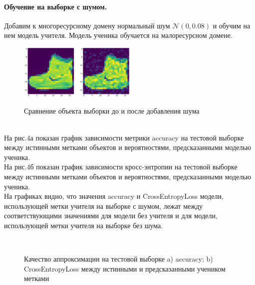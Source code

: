 \paragraph{Обучение на выборке с шумом.}
Добавим к многоресурсному домену нормальный шум $\mathcal{N}(0,0.08)$ и обучим на нем модель учителя. Модель ученика обучается на малоресурсном домене.
\begin{figure}[h!t]\center
{\includegraphics[width=0.5\textwidth]{results/noise}}
\caption{Сравнение объекта выборки до и после добавления шума}
\end{figure}\\
На рис.4а показан график зависимости метрики accuracy на тестовой выборке между истинными метками объектов и вероятностями, предсказанными моделью ученика.\\
На рис.4б показан график зависимости кросс-энтропии на тестовой выборке между истинными метками объектов и вероятностями, предсказанными моделью ученика.\\
На графиках видно, что значения accuracy и CrossEntropyLoss модели, использующей метки учителя на выборке с шумом, лежат между соответствующими значениями для модели без учителя и для модели, использующей метки учителя на выборке без шума.

\begin{figure}[h!t]\center
{}
\\
\caption{Качество аппроксимации на тестовой выборке a) accuracy; b) CrossEntropyLoss между истинными и предсказанными учеником метками}
\end{figure}

